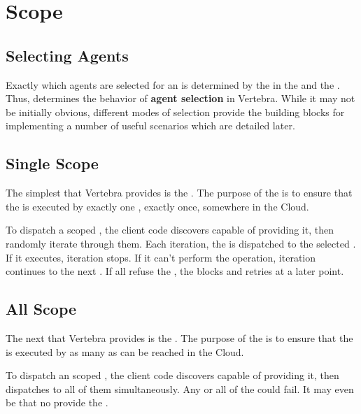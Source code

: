 \section{Scope}

\subsection{Selecting Agents}


Exactly which agents are selected for an \operation{} is determined by the \resources{} in the \operation{} and the \scope{}.  Thus, \scope{} determines the behavior of \textbf{agent selection} in Vertebra.  While it may not be initially obvious, different modes of selection provide the building blocks for implementing a number of useful scenarios which are detailed later.

\subsection{Single Scope}

The simplest \scope{} that Vertebra provides is the \single{} \scope{}. The purpose of the \single{} \scope{} is to ensure that the \operation{} is executed by exactly one \actor{}, exactly once, somewhere in the Cloud.

To dispatch a \single{} scoped \operation{}, the client code discovers \agents{} capable of providing it, then randomly iterate through them.  Each iteration, the \operation{} is dispatched to the selected \agent{}.  If it executes, iteration stops.  If it can't perform the operation, iteration continues to the next \agent{}.  If all \agents{} refuse the \operation{}, the \operation{} blocks and retries at a later point.

\subsection{All Scope}

The next \scope{} that Vertebra provides is the \all{} \scope{}.  The purpose of the \all{} \scope{} is to ensure that the \operation{} is executed by as many \actors{} as can be reached in the Cloud.

To dispatch an \all{} scoped \operation, the client code discovers \agents{} capable of providing it, then dispatches to all of them simultaneously.  Any or all of the \operations{} could fail.  It may even be that no \agents{} provide the \operation{}.

